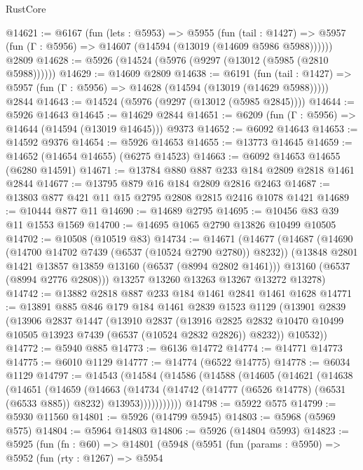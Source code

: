 \begin{lexlean}{RustCore}
\begin{coremodule}
@14621 := @6167
    (fun (lets : @5953) =>
    @5955
      (fun (tail : @1427) =>
      @5957 (fun (Γ : @5956) => @14607 (@14594 (@13019 (@14609 @5986 @5988))))))
    @2809
@14628 := @5926 (@14524 (@5976 (@9297 (@13012 (@5985 (@2810 @5988))))))
@14629 := @14609 @2809
@14638 := @6191
    (fun (tail : @1427) => @5957 (fun (Γ : @5956) => @14628 (@14594 (@13019 (@14629 @5988)))))
    @2844
@14643 := @14524 (@5976 (@9297 (@13012 (@5985 @2845))))
@14644 := @5926 @14643
@14645 := @14629 @2844
@14651 := @6209 (fun (Γ : @5956) => @14644 (@14594 (@13019 @14645))) @9373
@14652 := @6092 @14643
@14653 := @14592 @9376
@14654 := @5926 @14653
@14655 := @13773 @14645
@14659 := @14652 (@14654 @14655) (@6275 @14523)
@14663 := @6092 @14653 @14655 (@6280 @14591)
@14671 := @13784 @880 @887 @233 @184 @2809 @2818 @1461 @2844
@14677 := @13795 @879 @16 @184 @2809 @2816 @2463
@14687 := @13803 @877 @421 @11 @15 @2795 @2808 @2815 @2416 @1078 @1421
@14689 := @10444 @877 @11
@14690 := @14689 @2795
@14695 := @10456 @83 @39 @11 @1553 @1569
@14700 := @14695 @1065 @2790 @13826 @10499 @10505
@14702 := @10508 (@10519 @83)
@14734 := @14671
    (@14677
      (@14687
        (@14690 (@14700 @14702 @7439 (@6537 (@10524 @2790 @2780)) @8232))
        (@13848 @2801 @1421 @13857 @13859 @13160 (@6537 (@8994 @2802 @1461)))
        @13160
        (@6537 (@8994 @2776 @2808)))
      @13257
      @13260
      @13263
      @13267
      @13272
      @13278)
@14742 := @13882 @2818 @887 @233 @184 @1461 @2841 @1461 @1628
@14771 := @13891
    @885
    @846
    @179
    @184
    @1461
    @2839
    @1523
    @1129
    (@13901
      @2839
      (@13906
        @2837
        @1447
        (@13910
          @2837
          (@13916 @2825 @2832 @10470 @10499 @10505 @13923 @7439 (@6537 (@10524 @2832 @2826)) @8232))
        @10532))
@14772 := @5940 @885
@14773 := @6136 @14772
@14774 := @14771 @14773
@14775 := @6010 @1129
@14777 := @14774 (@6522 @14775)
@14778 := @6034 @1129
@14797 := @14543
    (@14584
      (@14586
        (@14588
          (@14605
            (@14621
              (@14638
                (@14651
                  (@14659
                    (@14663
                      (@14734
                        (@14742 (@14777 (@6526 @14778) (@6531 (@6533 @885)) @8232) @13953)))))))))))
@14798 := @5922 @575
@14799 := @5930 @11560
@14801 := @5926 (@14799 @5945)
@14803 := @5968 (@5969 @575)
@14804 := @5964 @14803
@14806 := @5926 (@14804 @5993)
@14823 := @5925
    (fun (fn : @60) =>
    @14801
      (@5948
        (@5951
          (fun (params : @5950) =>
          @5952
            (fun (rty : @1267) =>
            @5954

\end{coremodule}
\end{lexlean}
